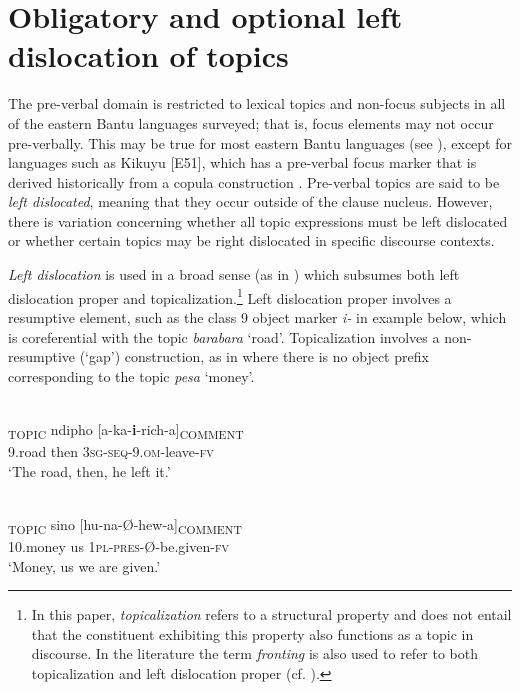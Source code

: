 \documentclass[output=paper]{langsci/langscibook}
\begin{document}
\section{Obligatory and optional left dislocation of topics}\label{§3:obligatory.nicolle}

The pre-verbal domain is restricted to lexical topics and non-focus subjects in all of the eastern Bantu languages surveyed; that is, focus elements may not occur pre-verbally. This may be true for most eastern Bantu languages (see \citealt{zerbian2006,vanderwal2009,yoneda2011}), except for languages such as Kikuyu [E51], which has a pre-verbal focus marker that is derived historically from a copula construction \citep{schwarz2003kikuyu,schwarz2007kikuyu,vanderwal2014}. Pre-verbal topics are said to be \textit{left dislocated}, meaning that they occur outside of the clause nucleus. However, there is variation concerning whether all topic expressions must be left dislocated or whether certain topics may be right dislocated in specific discourse contexts.

\textit{Left dislocation} is used in a broad sense (as in \citealt{shaeretal2009}) which subsumes both left dislocation proper and topicalization.\footnote{In this paper, \textit{topicalizat}\textit{ion} refers to a structural property and does not entail that the constituent exhibiting this property also functions as a topic in discourse. In the literature the term \textit{fronting} is also used to refer to both topicalization and left dislocation proper (cf. \citealt[313]{cohen2009}).} Left dislocation proper involves a resumptive element, such as the class 9 object marker \textit{i}\textit{-} in example  below, which is coreferential with the topic \textit{barabara} ‘road’. Topicalization involves a non-resumptive (‘gap’) construction, as in  where there is no object prefix corresponding to the topic \textit{pesa} ‘money’.

\ea\label{ex:2.nicolle}
\\
\gll [Barabara]\textsubscript{TOPIC} ndipho [a-ka-\textbf{i}-rich-a]\textsubscript{COMMENT}\\
     {\db}9.road then {\db}\textsc{3sg-seq}-9.\textsc{om}-leave-\textsc{fv}\\
\glt ‘The road, then, he left it.’
\z

\ea\label{ex:3.nicolle}
\\
\gll [Pesa]\textsubscript{TOPIC} sino [hu-na-Ø-hew-a]\textsubscript{COMMENT}\\
{\db}10.money us {\db}\textsc{1pl-pres}-Ø-be.given-\textsc{fv}\\
\glt ‘Money, us we are given.’
\z
\end{document}
